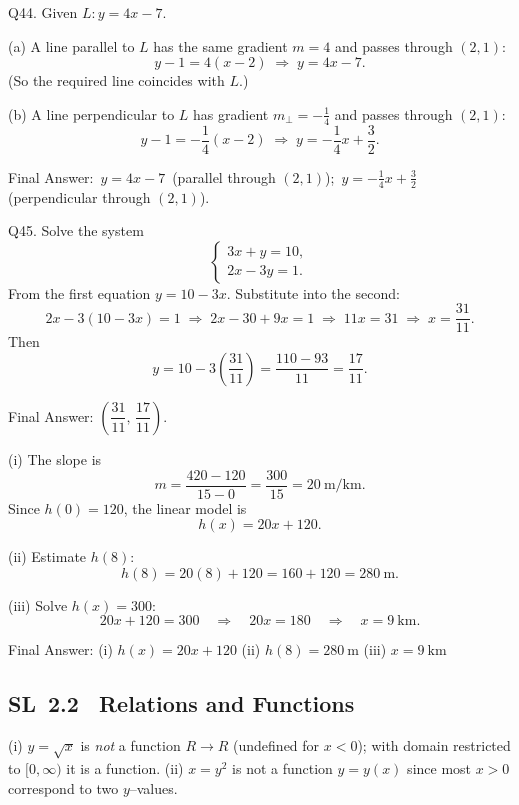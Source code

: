 \documentclass[11pt]{article}
\def\textbf#1{#1}%
\def\mathbb#1{#1}%
\newcommand{\tocsubsection}[1]{\subsection{#1}}
\begin{document}
\begin{solution}
\textbf{Q44.}  Given \(L: y=4x-7\).

(a) A line parallel to \(L\) has the same gradient \(m=4\) and passes through \((2,1)\):
\[
y-1=4(x-2)\;\Rightarrow\; y=4x-7.
\]
(So the required line coincides with \(L\).)

(b) A line perpendicular to \(L\) has gradient \(m_\perp=-\tfrac14\) and passes through \((2,1)\):
\[
y-1=-\frac14(x-2)\;\Rightarrow\; y=-\frac14x+\frac32.
\]

\textbf{Final Answer:} 
\(\boxed{\,y=4x-7\,}\) (parallel through \((2,1)\)); \(\boxed{\,y=-\tfrac14 x+\tfrac32\,}\) (perpendicular through \((2,1)\)).
\end{solution}

\begin{solution}
\textbf{Q45.}  Solve the system
\[
\begin{cases}
3x+y=10,\\
2x-3y=1.
\end{cases}
\]
From the first equation \(y=10-3x\). Substitute into the second:
\[
2x-3(10-3x)=1 \;\Rightarrow\; 2x-30+9x=1 \;\Rightarrow\; 11x=31 \;\Rightarrow\; x=\frac{31}{11}.
\]
Then
\[
y=10-3\!\left(\frac{31}{11}\right)=\frac{110-93}{11}=\frac{17}{11}.
\]

\textbf{Final Answer:} \(\boxed{\left(\dfrac{31}{11},\,\dfrac{17}{11}\right)}\).
\end{solution}

\begin{solution}
(i) The slope is  
\[
m = \frac{420 - 120}{15 - 0} = \frac{300}{15} = 20 \ \text{m/km}.
\]  
Since $h(0) = 120$, the linear model is  
\[
h(x) = 20x + 120.
\]

(ii) Estimate $h(8)$:  
\[
h(8) = 20(8) + 120 = 160 + 120 = 280 \ \text{m}.
\]

(iii) Solve $h(x) = 300$:  
\[
20x + 120 = 300 \quad\Rightarrow\quad 20x = 180 \quad\Rightarrow\quad x = 9 \ \text{km}.
\]

\textbf{Final Answer:}  
(i) $\boxed{h(x) = 20x + 120}$  
(ii) $\boxed{h(8) = 280\ \text{m}}$  
(iii) $\boxed{x = 9\ \text{km}}$
\end{solution}

\tocsubsection{SL 2.2 \; Relations and Functions}

\begin{solution}
(i) $y=\sqrt{x}$ is \emph{not} a function $\mathbb{R}\to\mathbb{R}$ (undefined for $x<0$);
with domain restricted to $[0,\infty)$ it is a function. (ii) $x=y^2$ is not a function
$y=y(x)$ since most $x>0$ correspond to two $y$–values.
\end{solution}
\end{document}
